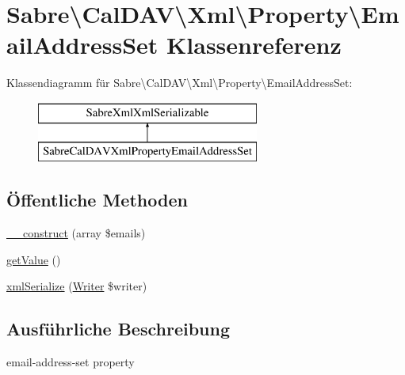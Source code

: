 \hypertarget{class_sabre_1_1_cal_d_a_v_1_1_xml_1_1_property_1_1_email_address_set}{}\section{Sabre\textbackslash{}Cal\+D\+AV\textbackslash{}Xml\textbackslash{}Property\textbackslash{}Email\+Address\+Set Klassenreferenz}
\label{class_sabre_1_1_cal_d_a_v_1_1_xml_1_1_property_1_1_email_address_set}
Klassendiagramm für Sabre\textbackslash{}Cal\+D\+AV\textbackslash{}Xml\textbackslash{}Property\textbackslash{}Email\+Address\+Set\+:\begin{figure}[H]
\begin{center}
\leavevmode
\includegraphics[height=2.000000cm]{class_sabre_1_1_cal_d_a_v_1_1_xml_1_1_property_1_1_email_address_set}
\end{center}
\end{figure}
\subsection*{Öffentliche Methoden}
\begin{DoxyCompactItemize}
\item 
\mbox{\hyperlink{class_sabre_1_1_cal_d_a_v_1_1_xml_1_1_property_1_1_email_address_set_abad418f916f99fd4f6915b7b8cd2daaa}{\+\_\+\+\_\+construct}} (array \$emails)
\item 
\mbox{\hyperlink{class_sabre_1_1_cal_d_a_v_1_1_xml_1_1_property_1_1_email_address_set_a6673b15b9ae810ebad47b1bb0d36dd33}{get\+Value}} ()
\item 
\mbox{\hyperlink{class_sabre_1_1_cal_d_a_v_1_1_xml_1_1_property_1_1_email_address_set_a15052a3882c08552dae343d1450cf6bc}{xml\+Serialize}} (\mbox{\hyperlink{class_sabre_1_1_xml_1_1_writer}{Writer}} \$writer)
\end{DoxyCompactItemize}


\subsection{Ausführliche Beschreibung}
email-\/address-\/set property

